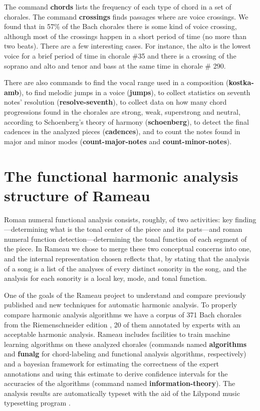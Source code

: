 The command \textbf{chords} lists the frequency of each type of chord
in a set of chorales. The command \textbf{crossings} finds passages where
are voice crossings. We found that in 57\% of the Bach chorales there
is some kind of voice crossing, although most of the crossings happen
in a short period of time (no more than two beats). There are a few
interesting cases. For instance, the alto is the lowest voice for a
brief period of time in chorale \#35 and there is a crossing of the
soprano and alto and tenor and bass at the same time in chorale \#
290.

There are also commands to find the vocal range used in a composition
(\textbf{kostka-amb}), to find melodic jumps in a voice
(\textbf{jumps}), to collect statistics on seventh notes' resolution
(\textbf{resolve-seventh}), to collect data on how many chord
progressions found in the chorales are strong, weak, superstrong and
neutral, according to Schoenberg's theory of harmony
\cite{schoenberg83:theory} (\textbf{schoenberg}), to detect the final
cadences in the analyzed pieces (\textbf{cadences}), and to count the
notes found in major and minor modes (\textbf{count-major-notes} and
\textbf{count-minor-notes}).

\section{The functional harmonic analysis structure of Rameau}
\label{sec:problem}

Roman numeral functional analysis consists, roughly, of two
activities: key finding---determining what is the tonal center of the
piece and its parts---and roman numeral function
detection---determining the tonal function of each segment of the
piece. In Rameau we chose to merge these two conceptual concerns into one,
and the internal representation chosen reflects that, by stating that
the analysis of a song is a list of the analyses of every distinct
sonority in the song, and the analysis for each sonority is a local
key, mode, and tonal function.

One of the goals of the Rameau project to understand and compare
previously published and new techniques for automatic harmonic
analysis. To properly compare harmonic analysis algorithms we have a
corpus of 371 Bach chorales from the Riemenschneider edition
\cite{bach41:371}, 20 of them annotated by experts with an acceptable
harmonic analysis. Rameau includes facilities to train machine
learning algorithms on these analyzed chorales (commands named
\textbf{algorithms} and \textbf{funalg} for chord-labeling and
functional analysis algorithms, respectively) and a bayesian framework
for estimating the correctness of the expert annotations and using
this estimate to derive confidence intervals for the accuracies of the
algorithms (command named \textbf{information-theory}). The analysis
results are automatically typeset with the aid of the Lilypond music
typesetting program \cite{nienhuys.ea08:lilypond}.

